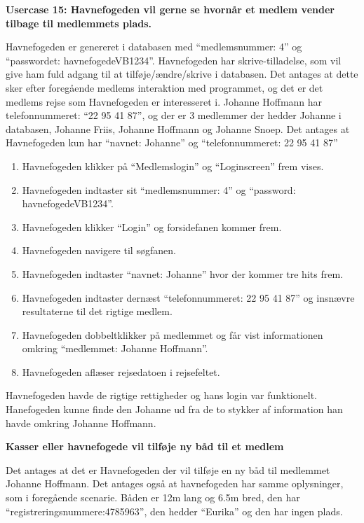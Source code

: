 \textbf{Usercase 15: Havnefogeden vil gerne se hvornår et medlem vender tilbage til medlemmets plads.}

Havnefogeden er genereret i databasen med \enquote{medlemsnummer: 4} og \enquote{passwordet: havnefogedeVB1234}. Havnefogeden har skrive-tilladelse, som vil give ham fuld adgang til at tilføje/ændre/skrive i databasen. Det antages at dette sker efter foregående medlems interaktion med programmet, og det er det medlems rejse som Havnefogeden er interesseret i. Johanne Hoffmann har telefonnummeret: \enquote{22 95 41 87}, og der er 3 medlemmer der hedder Johanne i databasen, Johanne Friis, Johanne Hoffmann og Johanne Snoep. Det antages at Havnefogeden kun har \enquote{navnet: Johanne} og \enquote{telefonnummeret: 22 95 41 87}

\begin{enumerate}
	\item Havnefogeden klikker på \enquote{Medlemslogin} og \enquote{Loginscreen} frem vises.
	\item Havnefogeden indtaster sit \enquote{medlemsnummer: 4} og \enquote{password: havnefogedeVB1234}.
	\item Havnefogeden klikker \enquote{Login} og forsidefanen kommer frem.
	\item Havnefogeden navigere til søgfanen.
	\item Havnefogeden indtaster \enquote{navnet: Johanne} hvor der kommer tre hits frem.
	\item Havnefogeden indtaster dernæst \enquote{telefonnummeret: 22 95 41 87} og insnævre resultaterne til det rigtige medlem.
	\item Havnefogeden dobbeltklikker på medlemmet og får vist informationen omkring \enquote{medlemmet: Johanne Hoffmann}.
	\item Havnefogeden aflæser rejsedatoen i rejsefeltet.
\end{enumerate} 

Havnefogeden havde de rigtige rettigheder og hans login var funktionelt. Hanefogeden kunne finde den Johanne ud fra de to stykker af information han havde omkring Johanne Hoffmann.

\textbf{Kasser eller havnefogede vil tilføje ny båd til et medlem}

Det antages at det er Havnefogeden der vil tilføje en ny båd til medlemmet Johanne Hoffmann. Det antages også at havnefogeden har samme oplysninger, som i foregående scenarie. Båden er 12m lang og 6.5m bred, den har \enquote{registreringsnummere:4785963}, den hedder \enquote{Eurika} og den har ingen plads.

